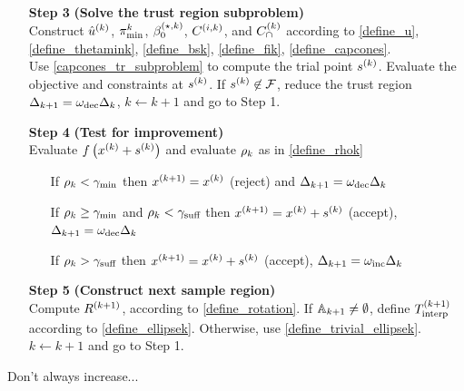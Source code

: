 \begin{algorithm}[H]
\begin{itemize}
        \item[\textbf{Step 3}] \textbf{(Solve the trust region subproblem)} \\
        	Construct ${{\hat u}^{(k)}}$, ${\pi^k_{\textrm{min}}}$, ${\beta_0^{(\star, k)}}$, ${C^{(i, k)}}$, and ${C^{(k)}_{\cap}}$ according to
        	\cref{define_u}, \cref{define_thetamink}, \cref{define_bsk}, \cref{define_fik}, \cref{define_capcones}. \\
        	Use \cref{capcones_tr_subproblem} to compute the trial point ${{s}^{(k)}}$.
        	Evaluate the objective and constraints at ${{s}^{(k)}}$.
        	If ${{s}^{(k)}} \not \in {\mathcal F}$, reduce the trust region $\Delta_{k+1} = \omega_{\text{dec}}\Delta_k$, $k \gets k+1$ and go to Step 1.
            
        \item[\textbf{Step 4}] \textbf{(Test for improvement)} \\
            Evaluate $f\left(x^{(k)} + {{s}^{(k)}}\right)$ and evaluate $\rho_k$ as in \cref{define_rhok} \begin{itemize}
                \item[] If $\rho_k < \gamma_{\textrm{min}}$ then ${{x}^{(k+1)}}=x^{(k)}$ (reject) and $\Delta_{k+1} = \omega_{\text{dec}}\Delta_k$
                \item[] If $\rho_k \ge \gamma_{\textrm{min}}$ and $\rho_k < \gamma_{\textrm{suff}}$ then ${{x}^{(k+1)}}=x^{(k)}+{{s}^{(k)}}$ (accept), $\Delta_{k+1} = \omega_{\text{dec}}\Delta_k$
                \item[] If $\rho_k > \gamma_{\textrm{suff}}$ then ${{x}^{(k+1)}}=x^{(k)}+{{s}^{(k)}}$ (accept), $\Delta_{k+1} = \omega_{\text{inc}}\Delta_k$
            \end{itemize}
            
        \item[\textbf{Step 5}] \textbf{(Construct next sample region)} \\
        	Compute ${R^{(k+1)}}$, according to \cref{define_rotation}.
        	If ${\mathbb A_{k+1}} \ne \emptyset$, define ${T_{\text{interp}}^{(k+1)}}$ according to \cref{define_ellipsek}.
        	Otherwise, use \cref{define_trivial_ellipsek}. \\
            $k \gets k+1$ and go to Step 1.
    \end{itemize}
\end{algorithm}

\begin{boxedcomment}
Don't always increase...
\end{boxedcomment}

